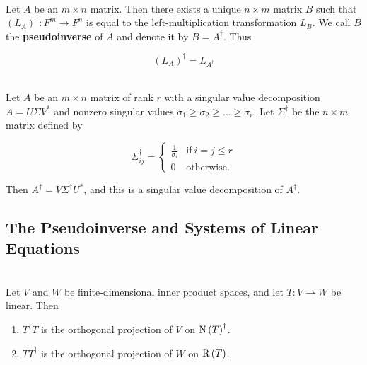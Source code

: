 \begin{definition}
	\hfill\\
	Let $A$ be an $m \times n$ matrix. Then there exists a unique $n \times m$ matrix $B$ such that $(L_A)^\dagger: F^m \to F^n$ is equal to the left-multiplication transformation $L_B$. We call $B$ the \textbf{pseudoinverse} of $A$ and denote it by $B = A^\dagger$. Thus
	
	\[(L_A)^\dagger = L_{A^\dagger}\]
\end{definition}

\begin{theorem}
	\hfill\\
	Let $A$ be an $m \times n$ matrix of rank $r$ with a singular value decomposition $A = U\Sigma V^*$ and nonzero singular values $\sigma_1 \geq \sigma_2 \geq \dots \geq \sigma_r$. Let $\Sigma^\dagger$ be the $n \times m$ matrix defined by

	\[\Sigma_{ij}^\dagger = \begin{cases}
			\frac{1}{\sigma_i} & \text{if}\ i = j \leq r \\
			0                  & \text{otherwise.}
		\end{cases}\]

	Then $A^\dagger = V\Sigma^\dagger U^*$, and this is a singular value decomposition of $A^\dagger$.
\end{theorem}

\subsection*{The Pseudoinverse and Systems of Linear Equations}

\begin{lemma}
	\hfill\\
	Let $V$ and $W$ be finite-dimensional inner product spaces, and let $T: V \to W$ be linear. Then

	\begin{enumerate}
		\item $T^\dagger T$ is the orthogonal projection of $V$ on $\text{N}\left(T\right)^\dagger$.
		\item $TT^\dagger$ is the orthogonal projection of $W$ on $\text{R}\left(T\right)$.
	\end{enumerate}
\end{lemma}


